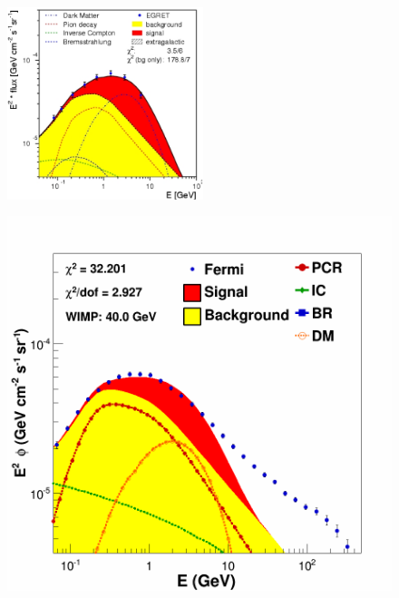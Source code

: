 \begin{figure}[h]
  \centering
  \begin{minipage}[h]{0.45\textwidth}
  	\centering
	\includegraphics[width=\linewidth, height=5.6cm]{pic/results/EGRET_A.png}
  	\label{fig:EGRET_comp_a}
  \end{minipage}
  \hfill  
  \begin{minipage}[h]{0.45\textwidth}
  	\centering
	\includegraphics[width=1.\linewidth]{pic/results/asEGRET_Fermi_A.png}
  	\label{fig:EGRET_comp_b}
  \end{minipage}

\end{figure}
